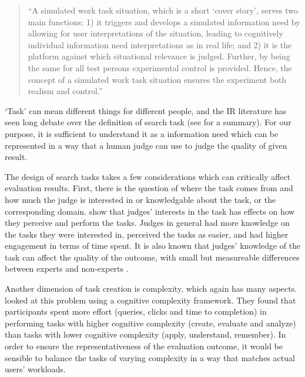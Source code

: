 \begin{quote}
``A simulated work task situation, which is a short `cover story', serves two main functions: 1) it triggers and develops a simulated information need by allowing for user interpretations of the situation, leading to cognitively individual information need interpretations as in real life; and 2) it is the platform against which situational relevance is judged. Further, by being the same for all test persons experimental control is provided. Hence, the concept of a simulated work task situation ensures the experiment both realism and control.''
\end{quote}

`Task' can mean different things for different people, and the IR literature has seen long debate over the definition of search task (see \cite{kelly2009methods} for a summary). For our purpose, it is sufficient to understand it as a information need which can be represented in a way that a human judge can use to judge the quality of given result.

The design of search tasks takes a few considerations which can critically affect evaluation results. First, there is the question of where the task comes from and how much the judge is interested in or knowledgable about the task, or the corresponding domain. \cite{Edwards:2016} show that judges' interests in the task has effects on how they perceive and perform the tasks. Judges in general had more knowledge on the tasks they were interested in, perceived the tasks as easier, and had higher engagement in terms of time spent. It is also known that judges' knowledge of the task can affect the quality of the outcome, with small but measureable differences between experts and non-experts \citep{Bailey:2008}.

Another dimension of task creation is complexity, which again has many aspects. \cite{Kelly:2015} looked at this problem using a cognitive complexity framework. They found that participants spent more effort (queries, clicks and time to completion) in performing tasks with higher cognitive complexity (create, evaluate and analyze) than tasks with lower cognitive complexity (apply, understand, remember). In order to ensure the representativeness of the evaluation outcome, it would be sensible to balance the tasks of varying complexity in a way that matches actual users' workloads.

